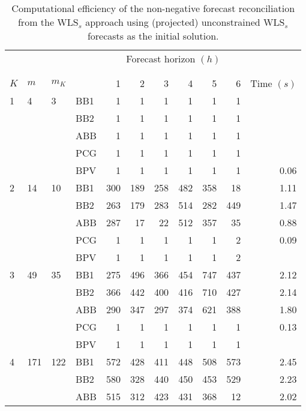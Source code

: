 \documentclass[11pt]{article}
\newcommand{\0}{\phantom{0}}
\begin{document}
\begin{table}[ht]
	\small
	\tabcolsep=0.20cm
	\captionsetup{belowskip=0pt, aboveskip=4pt}
	\caption{Computational efficiency of the non-negative forecast reconciliation from the WLS$_{s}$ approach using (projected) unconstrained WLS$_{s}$ forecasts as the initial solution.}
	\label{tbl:perfnnwlsp}
	\centering
	\begin{threeparttable}
		\begin{tabular}{llllrrrrrrr}
			\toprule
			& & & & \multicolumn{6}{c}{Forecast horizon $(h)$}\\[-0.4cm]\\\cline{5-10}\\[-0.3cm]
			$K$ & $m$ & $m_{K}$ & & 1 & 2 & 3 & 4 & 5 & 6 & Time $(s)$\\ 
			\midrule
			1 & 4 & 3 & BB1 & 1 & 1 & 1 & 1 & 1 & 1 & \pmb{$0.03$} \\
			& & & BB2 & 1 & 1 & 1 & 1 & 1 & 1 & \pmb{$0.03$} \\
			& & & ABB & 1 & 1 & 1 & 1 & 1 & 1 & \pmb{$0.03$} \\
			& & & PCG & 1 & 1 & 1 & 1 & 1 & 1 & \pmb{$0.03$} \\
			& & & BPV & 1 & 1 & 1 & 1 & 1 & 1 & 0.06 \\
			\midrule
			2 & 14 & 10 & BB1 & 300 & 189 & 258 & 482 & 358 & 18 & 1.11 \\			
			& & & BB2 & 263 & 179 & 283 & 514 & 282 & 449 & 1.47 \\
			& & & ABB & 287 & 17 & 22 & 512 & 357 & 35 & 0.88 \\
			& & & PCG & 1 & 1 & 1 & 1 & 1 & 2 & 0.09 \\
			& & & BPV & 1 & 1 & 1 & 1 & 1 & 2 & \pmb{$0.08$} \\
			\midrule
			3 & 49 & 35 & BB1 & 275 & 496 & 366 & 454 & 747 & 437 & 2.12 \\
			& & & BB2 & 366 & 442 & 400 & 416 & 710 & 427 & 2.14 \\
			& & & ABB & 290 & 347 & 297 & 374 & 621 & 388 & 1.80 \\
			& & & PCG & 1 & 1 & 1 & 1 & 1 & 1 & 0.13 \\	
			& & & BPV & 1 & 1 & 1 & 1 & 1 & 1 & \pmb{$0.07$} \\
			\midrule		
			4 & 171 & 122 & BB1 & 572 & 428 & 411 & 448 & 508 & 573 & 2.45 \\
			& & & BB2 & 580 & 328 & 440 & 450 & 453 & 529 & 2.23 \\
			& & & ABB & 515 & 312 & 423 & 431 & 368 & 12 & 2.02 \\

\end{tabular}
\end{threeparttable}
\end{table}
\end{document}
